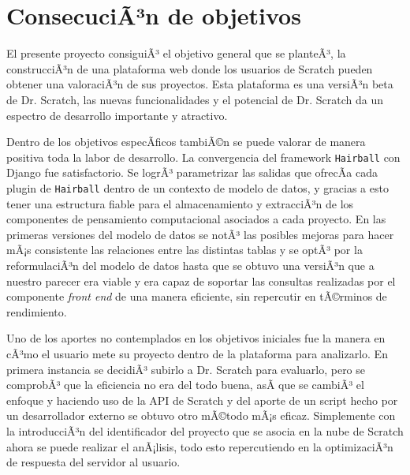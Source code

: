 \documentclass[a4paper, 12pt]{book}
\begin{document}
\section{ConsecuciÃ³n de objetivos}
\label{sec:consecucion-objetivos}

El presente proyecto consiguiÃ³ el objetivo general que se planteÃ³, la 
construcciÃ³n de una plataforma web donde los usuarios de Scratch pueden 
obtener una valoraciÃ³n de sus proyectos. Esta plataforma es una versiÃ³n
beta de Dr. Scratch, las nuevas funcionalidades y el potencial de Dr. 
Scratch da un espectro de desarrollo importante y atractivo.

Dentro de los objetivos especÃ­ficos tambiÃ©n se puede valorar de manera
positiva toda la labor de desarrollo. La convergencia del framework
\texttt{Hairball} con Django fue satisfactorio. Se logrÃ³ parametrizar las salidas
que ofrecÃ­a cada plugin de \texttt{Hairball} dentro de un contexto de modelo de
datos, y gracias a esto tener una estructura fiable para el almacenamiento
y extracciÃ³n de los componentes de pensamiento computacional asociados
a cada proyecto. En las primeras versiones del modelo de datos se notÃ³
las posibles mejoras para hacer mÃ¡s consistente las relaciones entre las
distintas tablas y se optÃ³ por la reformulaciÃ³n del modelo de datos hasta
que se obtuvo una versiÃ³n que a nuestro parecer era viable y era capaz
de soportar las consultas realizadas por el componente \emph{front end} de una
manera eficiente, sin repercutir en tÃ©rminos de rendimiento.

Uno de los aportes no contemplados en los objetivos iniciales fue la
manera en cÃ³mo el usuario mete su proyecto dentro de la plataforma
para analizarlo. En primera instancia se decidiÃ³ subirlo a Dr. Scratch
para evaluarlo, pero se comprobÃ³ que la eficiencia no era del todo
buena, asÃ­ que se cambiÃ³ el enfoque y haciendo uso de la API de Scratch
y del aporte de un script hecho por un desarrollador externo se 
obtuvo otro mÃ©todo mÃ¡s eficaz. Simplemente con la introducciÃ³n del 
identificador del proyecto que se asocia en la nube de Scratch ahora
se puede realizar el anÃ¡lisis, todo esto repercutiendo en la optimizaciÃ³n 
de respuesta del servidor al usuario.
\end{document}
